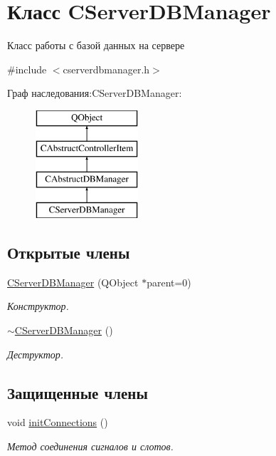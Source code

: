 \hypertarget{class_c_server_d_b_manager}{}\section{Класс C\+Server\+D\+B\+Manager}
\label{class_c_server_d_b_manager}


Класс работы с базой данных на сервере  




{\ttfamily \#include $<$cserverdbmanager.\+h$>$}

Граф наследования\+:C\+Server\+D\+B\+Manager\+:\begin{figure}[H]
\begin{center}
\leavevmode
\includegraphics[height=4.000000cm]{class_c_server_d_b_manager}
\end{center}
\end{figure}
\subsection*{Открытые члены}
\begin{DoxyCompactItemize}
\item 
\hyperlink{class_c_server_d_b_manager_af2bf11fcced1aad0ccd34a3d16c45a03}{C\+Server\+D\+B\+Manager} (Q\+Object $\ast$parent=0)
\begin{DoxyCompactList}\small\item\em Конструктор. \end{DoxyCompactList}\item 
\hyperlink{class_c_server_d_b_manager_a78afc3d1890662a9bcbb3d184ac71141}{$\sim$\+C\+Server\+D\+B\+Manager} ()
\begin{DoxyCompactList}\small\item\em Деструктор. \end{DoxyCompactList}\end{DoxyCompactItemize}
\subsection*{Защищенные члены}
\begin{DoxyCompactItemize}
\item 
void \hyperlink{class_c_server_d_b_manager_a6dcd2f88c0845cc79a47bac2ab9e9235}{init\+Connections} ()
\begin{DoxyCompactList}\small\item\em Метод соединения сигналов и слотов. \end{DoxyCompactList}\end{DoxyCompactItemize}
